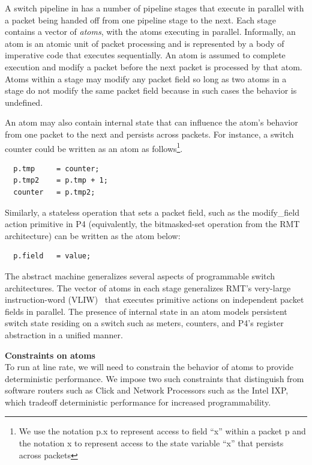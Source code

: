 A switch pipeline in \absmachine has a number of pipeline stages that execute
in parallel with a packet being handed off from one pipeline stage to the next.
Each stage contains a vector of \textit{atoms}, with the atoms executing in
parallel. Informally, an atom is an atomic unit of packet processing and is
represented by a body of imperative code that executes sequentially. An atom is
assumed to complete execution and modify a packet before the next packet is
processed by that atom. Atoms within a stage may modify any packet field so
long as two atoms in a stage do not modify the same packet field because in
such cases the behavior is undefined.

An atom may also contain internal state that can influence the atom's behavior
from one packet to the next and persists across packets. For instance, a switch
counter could be written as an atom as follows\footnote{We use the notation p.x
to represent access to field ``x'' within a packet p and the notation x to
represent access to the state variable ``x'' that persists across packets}.
\begin{verbatim}
  p.tmp     = counter;
  p.tmp2    = p.tmp + 1;
  counter   = p.tmp2;
\end{verbatim}
Similarly, a stateless operation that sets a packet field, such as the
modify\_field action primitive in P4 (equivalently, the bitmasked-set operation
from the RMT architecture) can be written as the atom below:
\begin{verbatim}
  p.field   = value;
\end{verbatim}

The \absmachine abstract machine generalizes several aspects of programmable
switch architectures. The vector of atoms in each stage generalizes RMT's
very-large instruction-word (VLIW)~\cite{rmt} that executes primitive actions
on independent packet fields in parallel. The presence of internal state in an
atom models persistent switch state residing on a switch such as meters,
counters, and P4's register abstraction in a unified manner.

\textbf{Constraints on atoms} \\

To run at line rate, we will need to constrain the behavior of atoms to provide
deterministic performance. We impose two such constraints that distinguish
\absmachine from software routers such as Click and Network Processors such as
the Intel IXP, which tradeoff deterministic performance for increased
programmability.

